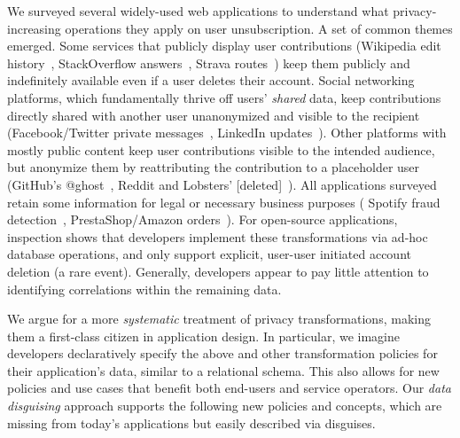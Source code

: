 %
We surveyed several widely-used web applications to understand what privacy-increasing operations
they apply on user unsubscription.
%
A set of common themes emerged.
%
Some services that publicly display user contributions (\eg Wikipedia edit
history~\cite{wikipedia:privacy}, StackOverflow answers~\cite{stackoverflow:privacy},
Strava routes~\cite{strava:privacy}) keep them publicly and indefinitely available even if a user deletes
their account.
%
Social networking platforms, which fundamentally thrive off users' \emph{shared} data, keep
contributions directly shared with another user unanonymized and visible to the recipient
(\eg Facebook/Twitter private messages~\cite{facebook:privacy, twitter:privacy},
LinkedIn updates~\cite{linkedin:privacy}).
%
Other platforms with mostly public content keep user contributions visible to the intended audience,
but anonymize them by reattributing the contribution to a placeholder user (\eg GitHub's
@ghost~\cite{github:privacy}, Reddit and Lobsters'
[deleted]~\cite{reddit:privacy, lobsters:privacy}).
%
%
All applications surveyed retain some information for legal or necessary business purposes (\eg
Spotify fraud detection~\cite{spotify:privacy}, PrestaShop/Amazon orders~\cite{amazon:privacy,
prestashop:privacy}).
%
For open-source applications, inspection shows that developers implement these transformations
via ad-hoc database operations, and only support explicit, user-user initiated account deletion
(a rare event).
%
Generally, developers appear to pay little attention to identifying correlations
within the remaining data.
%

%
We argue for a more \emph{systematic} treatment of privacy transformations, making them a
first-class citizen in application design.
%
In particular, we imagine developers declaratively specify the above and other transformation
policies for their application's data, similar to a relational schema.
%
This also allows for new policies and use cases that benefit both end-users and service operators.
%
Our \emph{data disguising} approach supports the following new policies and concepts,
which are missing from today's applications but easily described via disguises.
%

